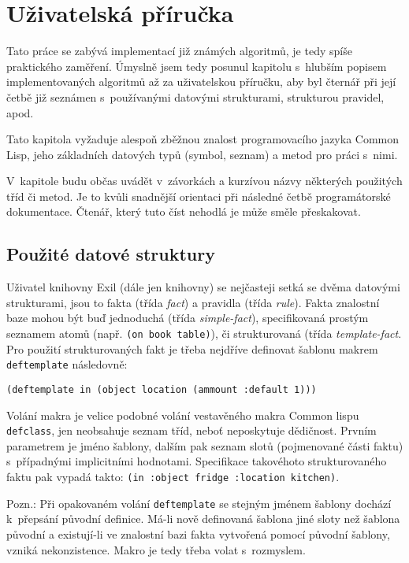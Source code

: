 \section{Uživatelská příručka}
Tato práce se zabývá implementací již známých algoritmů, je tedy spíše
praktického zaměření. Úmyslně jsem tedy posunul kapitolu s~hlubším popisem
implementovaných algoritmů až za uživatelskou příručku, aby byl čternář při
její četbě již seznámen s~používanými datovými strukturami, strukturou
pravidel, apod.

Tato kapitola vyžaduje alespoň zběžnou znalost programovacího jazyka
Common Lisp, jeho základních datových typů (symbol, seznam) a metod pro
práci s~nimi.

V~kapitole budu občas uvádět v~závorkách a kurzívou názvy některých použitých
tříd či metod. Je to kvůli snadnější orientaci při následné četbě programátorské
dokumentace. Čtenář, který tuto číst nehodlá je může směle přeskakovat.
\subsection{Použité datové struktury}
Uživatel knihovny Exil (dále jen knihovny) se nejčasteji setká se dvěma datovými
strukturami, jsou to fakta (třída \emph{fact}) a pravidla (třída \emph{rule}).
Fakta znalostní baze mohou být buď jednoduchá (třída \emph{simple-fact}),
specifikovaná prostým seznamem atomů (např. \verb|(on book table)|), či
strukturovaná (třída \emph{template-fact}. Pro použití strukturovaných fakt je
třeba nejdříve definovat šablonu makrem \verb|deftemplate| následovně:
\begin{verbatim}
(deftemplate in (object location (ammount :default 1)))
\end{verbatim}
Volání makra je velice podobné volání vestavěného makra Common lispu
\verb|defclass|, jen neobsahuje seznam tříd, neboť neposkytuje dědičnost.
Prvním parametrem je jméno šablony, dalším pak seznam slotů (pojmenované
části faktu) s~případnými implicitními hodnotami. Specifikace takovéhoto
 strukturovaného faktu pak vypadá takto:
\verb|(in :object fridge :location kitchen)|.

Pozn.: Při opakovaném volání \verb|deftemplate| se stejným jménem šablony
dochází k~přepsání původní definice. Má-li nově definovaná šablona jiné sloty
než šablona původní a existují-li ve znalostní bazi fakta vytvořená pomocí
původní šablony, vzniká nekonzistence. Makro je tedy třeba volat s~rozmyslem.

